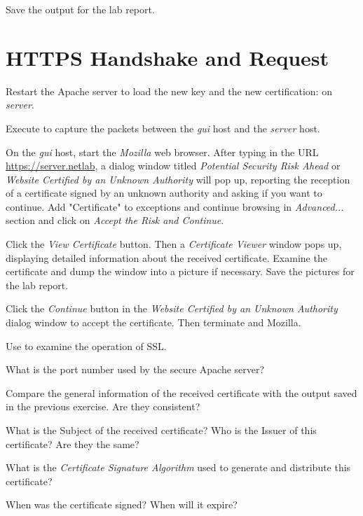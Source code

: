 \documentclass{../UTNetLab}
\begin{document}
    Save the output for the lab report.

\section{HTTPS Handshake and Request}
    Restart the Apache server to load the new key and the new certification:  on \textit{server}.

    Execute  to capture the packets between the \textit{gui} host and the \textit{server} host.

    On the \textit{gui} host, start the \textit{Mozilla} web browser.
    After typing in the URL \url{https://server.netlab}, a dialog window titled \textit{Potential Security Risk Ahead} or \textit{Website Certified by an Unknown Authority} will pop up, reporting the reception of a certificate signed by an unknown authority and asking if you want to continue.
    Add "Certificate" to exceptions and continue browsing in \textit{Advanced...} section and click on \textit{Accept the Risk and Continue}.

    Click the \textit{View Certificate} button.
    Then a \textit{Certificate Viewer} window pops up, displaying detailed information about the received certificate.
    Examine the certificate and dump the window into a picture if necessary.
    Save the pictures for the lab report.

    Click the \textit{Continue} button in the \textit{Website Certified by an Unknown Authority} dialog window to accept the certificate.
    Then terminate  and Mozilla.

    Use  to examine the operation of SSL.

    \begin{report}
        \item What is the port number used by the secure Apache server?
        
        \item Compare the general information of the received certificate with the  output saved in the previous exercise.
            Are they consistent?
        
        \item What is the Subject of the received certificate? Who is the Issuer of this certificate? Are they the same?
        
        \item What is the \textit{Certificate Signature Algorithm} used to generate and distribute this certificate?
        
        \item When was the certificate signed? When will it expire?
    \end{report}
\end{document}

